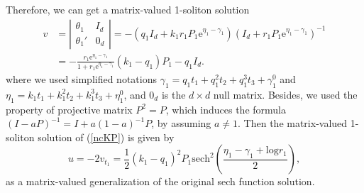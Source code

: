 \documentclass[11p,reqno]{amsart}
\numberwithin{equation}{section}
\numberwithin{equation}{section}
\begin{document}
Therefore, we can get a matrix-valued 1-soliton solution
\begin{equation}
    \begin{split}
        v &= \left|\begin{array}{cc}
        \theta_1&I_d\\
        \theta_1'&\boxed{0_d}
        \end{array}
        \right|=- \left(q_1 I_d + k_1r_1P_1 \mathrm{e}^{\eta_1-\gamma_1}\right) \left(I_d + r_1P_1\mathrm{e}^{\eta_1-\gamma_1}\right)^{-1} \\
        &= -\frac{r_1 \mathrm{e}^{\eta_1-\gamma_1}}{1 + r_1 \mathrm{e}^{\eta_1-\gamma_1}} \left(k_1-q_1\right)P_1 - q_1I_d.
    \end{split}
\end{equation}
where we used simplified notations $\gamma_1=q_1t_1+q_1^2t_2+q_1^3t_3+\gamma_1^0$ and $\eta_1=k_1t_1+k_1^2t_2+k_1^3t_3+\eta_1^0$, and $0_d$ is the $d\times d$ null matrix.
Besides, we used the property of projective matrix $P^2=P$, which induces the formula $\left(I - aP\right)^{-1} = I +a(1-a)^{-1} P$, by assuming $a \neq 1$. Then the matrix-valued 1-soliton solution of (\ref{ncKP}) is given by
\begin{equation} \label{1-soliton}
    u = -2v_{t_1} = \frac{1}{2} \left(k_1-q_1\right)^2 P_1 \mathrm{sech}^2 \left(\frac{\eta_1-\gamma_1+ \mathrm{log} r_1}{2}\right),
\end{equation}
as a matrix-valued generalization of the original sech function solution.
\end{document}
